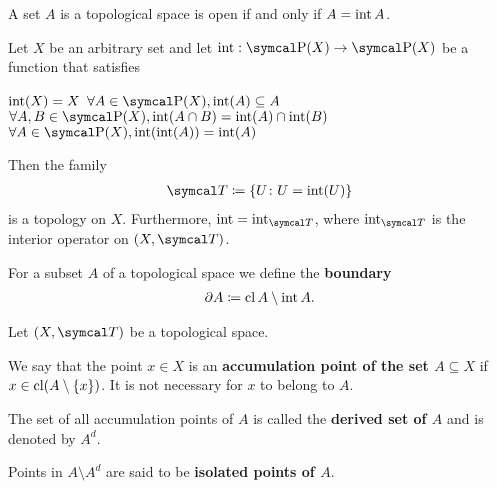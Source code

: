 \begin{proposition}\label{thm:set_open_iff_matches_interior}
  A set \( A \) is a topological space is open if and only if \( A = \operatorname{int} A \).
\end{proposition}

\begin{proposition}\label{thm:interior_operator_axioms}
  Let \( X \) be an arbitrary set and let \( \Int: \Power(X) \to \Power(X) \) be a function that satisfies
  \begin{description}
     \( \operatorname{int}(X) = X \)
     \( \forall A \in \Power(X), \Int(A) \subseteq A \)
     \( \forall A, B \in \Power(X), \Int(A \cap B) = \Int(A) \cap \Int(B) \)
     \( \forall A \in \Power(X), \Int(\Int(A)) = \Int(A) \)
  \end{description}

  Then the family
  \begin{align*}
    \Cal{T} \coloneqq \{ U \colon U = \Int(U) \}
  \end{align*}
  is a topology on \( X \). Furthermore, \( \Int = \Int_{\Cal{T}} \), where \( \Int_{\Cal{T}} \) is the interior operator on \( (X, \Cal{T}) \).
\end{proposition}

\begin{definition}\label{def:topological_boundary}\cite[24]{Engelking1989}
  For a subset \( A \) of a topological space we define the \textbf{boundary}
  \begin{align*}
    \partial A \coloneqq \operatorname{cl}{A} \setminus \operatorname{int}{A}.
  \end{align*}
\end{definition}

\begin{definition}\label{def:topologically_derived_set}\cite[24]{Engelking1989}
  Let \( (X, \Cal{T}) \) be a topological space.

  \begin{defenum}
    \item\label{def:topologically_derived_set/accumulation_point} We say that the point \( x \in X \) is an \textbf{accumulation point of the set \( A \subseteq X \)} if \( x \in \operatorname{cl}(A \setminus \{ x \}) \). It is not necessary for \( x \) to belong to \( A \).

    \item\label{def:topologically_derived_set/derived_set} The set of all accumulation points of \( A \) is called the \textbf{derived set of \( A \)} and is denoted by \( A^d \).

    \item\label{def:topologically_derived_set/isolated_point} Points in \( A \setminus A^d \) are said to be \textbf{isolated points of \( A \)}.
  \end{defenum}
\end{definition}

